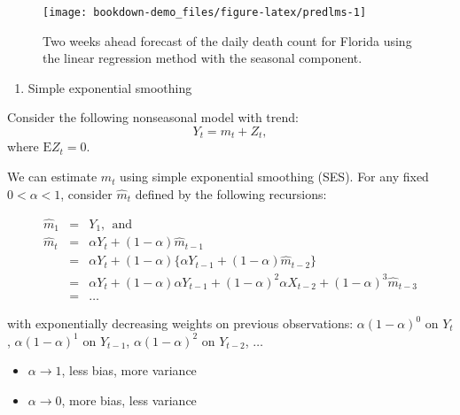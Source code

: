 \documentclass[]{book}
\newenvironment{Shaded}{\begin{snugshade}}{\end{snugshade}}
\newcommand{\KeywordTok}[1]{\textcolor[rgb]{0.13,0.29,0.53}{\textbf{#1}}}
\newcommand{\DecValTok}[1]{\textcolor[rgb]{0.00,0.00,0.81}{#1}}
\newcommand{\StringTok}[1]{\textcolor[rgb]{0.31,0.60,0.02}{#1}}
\newcommand{\OperatorTok}[1]{\textcolor[rgb]{0.81,0.36,0.00}{\textbf{#1}}}
\newcommand{\NormalTok}[1]{#1}
\providecommand{\tightlist}{%
  \setlength{\itemsep}{0pt}\setlength{\parskip}{0pt}}
\begin{document}
\begin{Shaded}
\end{Shaded}

\begin{figure}

{\centering \texttt{[image: bookdown-demo\_files/figure-latex/predlms-1]} 

}

\caption{Two weeks ahead forecast of the daily death count for Florida using the linear regression method with the seasonal component.}\label{fig:predlms}
\end{figure}

\begin{enumerate}
\def\labelenumi{\arabic{enumi}.}
\setcounter{enumi}{1}
\tightlist
\item
  Simple exponential smoothing
\end{enumerate}

Consider the following nonseasonal model with trend: \[
Y_t=m_t+Z_t,
\] where \(\mathrm{E}Z_t=0\).

We can estimate \(m_t\) using simple exponential smoothing (SES). For
any fixed \(0<\alpha<1\), consider \(\hat{m}_t\) defined by the
following recursions:

\begin{eqnarray*}
\hat{m}_1 &=& Y_1, \mathrm{~~and}\\
\hat{m}_t &=& \alpha Y_t+(1-\alpha)\hat{m}_{t-1}\\
          &=& \alpha Y_t+(1-\alpha)\{\alpha Y_{t-1}+(1-\alpha)\hat{m}_{t-2}\}\\
          &=& \alpha Y_t+(1-\alpha)\alpha Y_{t-1}+(1-\alpha)^2\alpha X_{t-2}+(1-\alpha)^3\hat{m}_{t-3}\\
          &=& \ldots
\end{eqnarray*}

with exponentially decreasing weights on previous observations:
\(\alpha(1-\alpha)^0\) on \(Y_t\), \(\alpha(1-\alpha)^1\) on
\(Y_{t-1}\), \(\alpha(1-\alpha)^2\) on \(Y_{t-2}\), \(\ldots\)

\begin{itemize}
\tightlist
\item
  \(\alpha\rightarrow 1\), less bias, more variance
\item
  \(\alpha\rightarrow 0\), more bias, less variance
\end{itemize}
\end{document}
